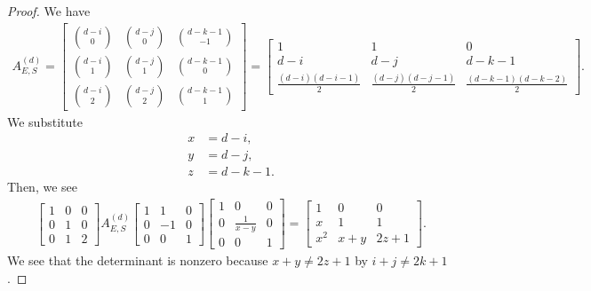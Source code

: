 \begin{proof}
    We have 
    \begin{align*}
        A^{(d)}_{E,S} = \begin{bmatrix}
            \binom{d-i}{0} & \binom{d-j}{0} & \binom{d-k-1}{-1} \\
            \binom{d-i}{1} & \binom{d-j}{1} & \binom{d-k-1}{0} \\
            \binom{d-i}{2} & \binom{d-j}{2} & \binom{d-k-1}{1}
        \end{bmatrix} = \begin{bmatrix}
            1 & 1 & 0 \\
            d-i & d-j & d-k-1 \\
            \frac{(d-i)(d-i-1)}{2} & \frac{(d-j)(d-j-1)}{2} & \frac{(d-k-1)(d-k-2)}{2}
        \end{bmatrix}.
    \end{align*}
    We substitute 
    \begin{align*}
        x &= d - i, \\
        y &= d - j, \\
        z &= d - k - 1.
    \end{align*}
    Then, we see 
    \begin{align*}
        \begin{bmatrix}
            1 & 0 & 0 \\
            0 & 1 & 0 \\
            0 & 1 & 2
        \end{bmatrix}
        A^{(d)}_{E,S} \begin{bmatrix}
            1 & 1 & 0 \\
            0 & -1 & 0 \\
            0 & 0 & 1
        \end{bmatrix}
        \begin{bmatrix}
            1 & 0 & 0 \\
            0 & \frac{1}{x-y} & 0 \\
            0 & 0 & 1
        \end{bmatrix} = 
        \begin{bmatrix}
            1 & 0 & 0 \\
            x & 1 & 1 \\
            x^2 & x+y & 2z+1
        \end{bmatrix}.
    \end{align*}
    We see that the determinant is nonzero because \( x + y \neq 2z + 1 \) by \( i+j \neq 2k+1 \).
\end{proof}

